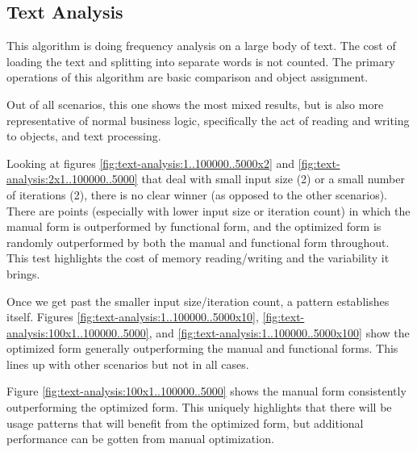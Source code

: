 \subsection{Text Analysis}
This algorithm is doing frequency analysis on a large body of text.  The cost of loading the text and splitting into separate words is not counted.  The primary operations of this algorithm are basic comparison and object assignment. 

Out of all scenarios, this one shows the most mixed results, but is also more representative of normal business logic, specifically the act of reading and writing to objects, and text processing.

Looking at figures \ref{fig:text-analysis:1..100000..5000x2} and \ref{fig:text-analysis:2x1..100000..5000} that deal with small input size (2) or a small number of iterations (2), there is no clear winner (as opposed to the other scenarios).  There are points (especially with lower input size or iteration count) in which the manual form is outperformed by functional form, and the optimized form is randomly outperformed by both the manual and functional form throughout.  This test highlights the cost of memory reading/writing and the variability it brings.

Once we get past the smaller input size/iteration count, a pattern establishes itself.  Figures \ref{fig:text-analysis:1..100000..5000x10}, \ref{fig:text-analysis:100x1..100000..5000}, and \ref{fig:text-analysis:1..100000..5000x100} show the optimized form generally outperforming the manual and functional forms.  This lines up with other scenarios but not in all cases. 

Figure \ref{fig:text-analysis:100x1..100000..5000} shows the manual form consistently outperforming the optimized form. This uniquely highlights that there will be usage patterns that will benefit from the optimized form, but additional performance can be gotten from manual optimization. 